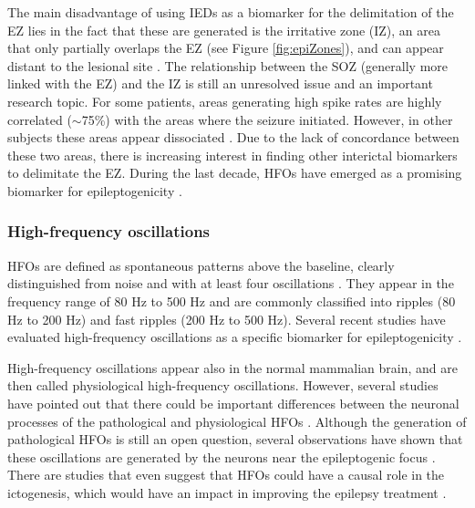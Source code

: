 The main disadvantage of using IEDs as a biomarker for the delimitation of the EZ lies in the fact that these are generated is the irritative zone (IZ), an area that only partially overlaps the EZ (see Figure \ref{fig:epiZones}), and can appear distant to the lesional site \citep{Penfield1954}. The relationship between the SOZ (generally more linked with the EZ) and the IZ is still an unresolved issue and an important research topic. For some patients, areas generating high spike rates are highly correlated ($\sim$75\%) with the areas where the seizure initiated. However, in other subjects these areas appear dissociated \citep{Bartolomei2016}. Due to the lack of concordance between these two areas, there is increasing interest in finding other interictal biomarkers to delimitate the EZ. During the last decade, HFOs have emerged as a promising biomarker for epileptogenicity \citep{Jacobs2012}. 

\subsubsection{High-frequency oscillations}

HFOs are defined as spontaneous patterns above the baseline, clearly distinguished from noise and with at least four oscillations \citep{Worrel2012}. They appear in the frequency range of 80 Hz to 500 Hz and are commonly classified into ripples (80 Hz to 200 Hz) and fast ripples (200 Hz to 500 Hz). Several recent studies have evaluated high-frequency oscillations as a specific biomarker for epileptogenicity \citep{Jacobs2012,Fujiwara2012,YanPing2015}.

High-frequency oscillations appear also in the normal mammalian brain, and are then called physiological high-frequency oscillations. However, several studies have pointed out that there could be important differences between the neuronal processes of the pathological and physiological HFOs \citep{Staba2014}. Although the generation of pathological HFOs is still an open question, several observations have shown that these oscillations are generated by the neurons near the epileptogenic focus \citep{Jefferys2012}. There are studies that even suggest that HFOs could have a causal role in the ictogenesis, which would have an impact in improving the epilepsy treatment \citep{Jiruska2010}.


